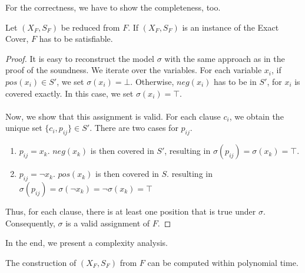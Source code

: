 For the correctness, we have to show the completeness, too.
\begin{lemma}[Completeness]
    Let $(X_F, S_F)$ be reduced from $F$. If $(X_F, S_F)$ is an instance of the Exact Cover, $F$ has to be satisfiable.
\end{lemma}
\begin{proof}
    It is easy to reconstruct the model $\sigma$ with the same approach as in the proof of the soundness. 
    We iterate over the variables. For each variable $x_i$, if $pos(x_i) \in S'$, we set $\sigma(x_i) = \bot$. 
    Otherwise, $neg(x_i)$ has to be in $S'$, for $x_i$ is covered exactly. In this case, we set $\sigma(x_i) = \top$. \\\\
    Now, we show that this assignment is valid. For each clause $c_i$, we obtain the unique set $\{c_i, p_{ij}\} \in S'$.
    There are two cases for $p_{ij}$.
    \begin{enumerate}
        \item $p_{ij} = x_k$. $neg(x_k)$ is then covered in $S'$, resulting in $\sigma(p_{ij}) = \sigma(x_k) = \top$.
        \item $p_{ij} = \neg x_k$. $pos(x_k)$ is then covered in $S$. resulting in $\sigma(p_{ij}) = \sigma(\neg x_k) = \neg \sigma(x_k) = \top$
    \end{enumerate}
    Thus, for each clause, there is at least one position that is true under $\sigma$. 
    Consequently, $\sigma$ is a valid assignment of $F$.
\end{proof}
In the end, we present a complexity analysis.
\begin{lemma}
    The construction of $(X_F, S_F)$ from $F$ can be computed within polynomial time. 
\end{lemma}
